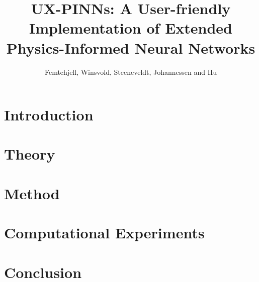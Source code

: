 \documentclass[aps,rmp,reprint,amsmath,amssymb,graphicx,longbibliography,twocolumn,floatfix]{revtex4-1}
\begin{document}

\title{UX-PINNs: A User-friendly Implementation of Extended Physics-Informed Neural Networks}

\author{Femtehjell, Winsvold, Steeneveldt, Johannessen and Hu}


\begin{abstract}

\end{abstract}

\maketitle

\tableofcontents

\section{Introduction}
\label{sec:introduction}

\section{Theory}
\label{sec:theory}

\section{Method}
\label{sec:method}

\section{Computational Experiments}
\label{sec:compexp}

\section{Conclusion}
\label{sec:conclusion}


\appendix

\end{document}
